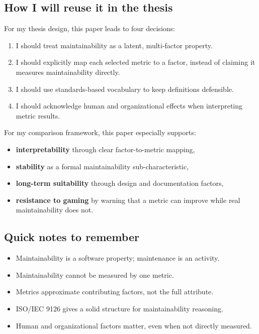 \documentclass[11pt,a4paper]{article}
\begin{document}
\subsection{How I will reuse it in the thesis}
For my thesis design, this paper leads to four decisions:
\begin{enumerate}[leftmargin=*]
  \item I should treat maintainability as a latent, multi-factor property.
  \item I should explicitly map each selected metric to a factor, instead of claiming it measures maintainability directly.
  \item I should use standards-based vocabulary to keep definitions defensible.
  \item I should acknowledge human and organizational effects when interpreting metric results.
\end{enumerate}

For my comparison framework, this paper especially supports:
\begin{itemize}[leftmargin=*]
  \item \textbf{interpretability} through clear factor-to-metric mapping,
  \item \textbf{stability} as a formal maintainability sub-characteristic,
  \item \textbf{long-term suitability} through design and documentation factors,
  \item \textbf{resistance to gaming} by warning that a metric can improve while real maintainability does not.
\end{itemize}

\subsection{Quick notes to remember}
\begin{itemize}[leftmargin=*]
  \item Maintainability is a software property; maintenance is an activity.
  \item Maintainability cannot be measured by one metric.
  \item Metrics approximate contributing factors, not the full attribute.
  \item ISO/IEC 9126 gives a solid structure for maintainability reasoning.
  \item Human and organizational factors matter, even when not directly measured.
\end{itemize}
\end{document}
